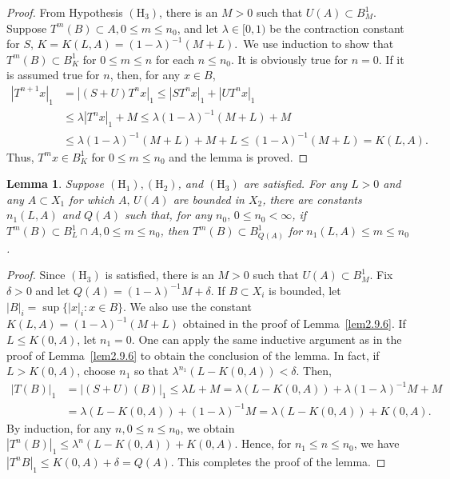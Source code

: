 \documentclass{surv-l}
\theoremstyle{plain}
\newtheorem{lemma}[theorem]{Lemma}
\theoremstyle{definition}
\numberwithin{equation}{section}
\numberwithin{figure}{chapter}
\begin{document}
\begin{proof} From Hypothesis $({\mathrm{H}}_{3})$, there is an $M>0$ such that $U(A)\subset B_{M}^{1}$. Suppose $T^{m}(B)\subset A, 0\leq m\leq n_{0}$, and let $\lambda \in[0,1)$ be the contraction constant for $S,\, K=K(L, A)=(1 - \lambda)^{-1}(M + L)$.\, We use induction to show that $T^{m}(B)\subset B_{K}^{1}$ for $0\leq m\leq n$ for each $n\leq n_{0}$. It is obviously true for $n=0$. If it is assumed true for $n$, then, for any $x\in B$,
\begin{align*}
|T^{n+1}x|_{1}&=|(S+U)T^{n}x|_{1}\leq|ST^{n}x|_{1}+|UT^{n}x|_{1}\\
&\leq\lambda|T^{n}x|_{1}+M\leq\lambda(1-\lambda)^{-1}(M+L)+M\\
&\leq\lambda(1-\lambda)^{-1}(M+L)+M+L\leq(1-\lambda)^{-1}(M+L)=K(L, A).
\end{align*}
Thus, $T^{m}x\in B_{K}^{1}$ for $0\leq m\leq n_{0}$ and the lemma is proved.
\end{proof}

\begin{lemma}\label{lem2.9.7} Suppose $({\mathrm{H}}_{1}), ({\mathrm{H}}_{2})$, and $({\mathrm{H}}_{3})$ are satisfied. For any $L>0$ and any $A\subset X_{1}$ for which $A,\, U(A)$ are bounded in $X_{2}$, there are constants $n_{1}(L, A)$ and $Q(A)$ such that, for any $n_{0},\, 0\leq n_{0}<\infty$, if $T^{m}(B)\subset B_{L}^{1}\cap A, 0\leq m\leq n_{0}$, then $T^{m}(B)\subset B_{Q(A)}^{1}$ for $n_{1}(L, A)\leq m\leq n_{0}$.
\end{lemma}

\begin{proof} Since $({\mathrm{H}}_{3})$ is satisfied, there is an $M>0$ such that $U(A)\subset B_{M}^{1}$. Fix $\delta>0$ and let $ Q(A)=(1-\lambda)^{-1}M+\delta$. If $B\subset X_{i}$ is bounded, let $|B|_{i}= \displaystyle \sup\{|x|_{i}\!:x\in B\}$. We also use the constant $K(L, A)=(1-\lambda)^{-1}(M+L)$ obtained in the proof of Lemma~\ref{lem2.9.6}. If $L\leq K(0, A)$, let $n_{1}=0$. One can apply the same inductive argument as in the proof of Lemma~\ref{lem2.9.6} to obtain the conclusion of the lemma. In fact, if $L>K(0, A)$, choose $n_{1}$ so that $\lambda^{n_{1}}(L-K(0, A))<\delta$. Then,
\begin{align*}
|T(B)|_{1}&=|(S+U)(B)|_{1}\leq\lambda L+M=\lambda(L-K(0, A))+\lambda(1-\lambda)^{-1}M+M\\
&=\lambda(L-K(0, A))+(1-\lambda)^{-1}M=\lambda(L-K(0, A))+K(0, A).
\end{align*}
By induction, for any $n, 0\leq n\leq n_{0}$, we obtain $|T^{n}(B)|_{1}\leq\lambda^{n}(L-K(0, A))+ K(0, A)$. Hence, for $n_{1}\leq n\leq n_{0}$, we have $|T^{n}B|_{1}\leq K(0, A)+\delta=Q(A)$. This completes the proof of the lemma.
\end{proof}
\end{document}
